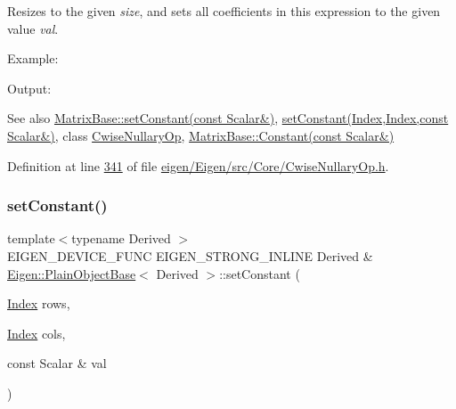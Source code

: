 Resizes to the given {\itshape size}, and sets all coefficients in this expression to the given value {\itshape val}.

Example\+: 
\begin{DoxyCodeInclude}
\end{DoxyCodeInclude}
 Output\+: 
\begin{DoxyVerbInclude}
\end{DoxyVerbInclude}


\begin{DoxySeeAlso}{See also}
\hyperlink{group___core___module_a19b2bc788277e9ab3f967a8857e290ae}{Matrix\+Base\+::set\+Constant(const Scalar\&)}, \hyperlink{class_eigen_1_1_plain_object_base_a56d1fe5d2156174f88341e563bb3c5a9}{set\+Constant(\+Index,\+Index,const Scalar\&)}, class \hyperlink{group___core___module_class_eigen_1_1_cwise_nullary_op}{Cwise\+Nullary\+Op}, \hyperlink{group___core___module_a9053c1a2e9993febe50113b05aac0f20}{Matrix\+Base\+::\+Constant(const Scalar\&)} 
\end{DoxySeeAlso}


Definition at line \hyperlink{eigen_2_eigen_2src_2_core_2_cwise_nullary_op_8h_source_l00341}{341} of file \hyperlink{eigen_2_eigen_2src_2_core_2_cwise_nullary_op_8h_source}{eigen/\+Eigen/src/\+Core/\+Cwise\+Nullary\+Op.\+h}.

\mbox{\label{class_eigen_1_1_plain_object_base_a56d1fe5d2156174f88341e563bb3c5a9}} 
\subsubsection{\texorpdfstring{set\+Constant()}{setConstant()}\hspace{0.1cm}{\footnotesize\ttfamily [2/2]}}
{\footnotesize\ttfamily template$<$typename Derived $>$ \\
E\+I\+G\+E\+N\+\_\+\+D\+E\+V\+I\+C\+E\+\_\+\+F\+U\+NC E\+I\+G\+E\+N\+\_\+\+S\+T\+R\+O\+N\+G\+\_\+\+I\+N\+L\+I\+NE Derived \& \hyperlink{class_eigen_1_1_plain_object_base}{Eigen\+::\+Plain\+Object\+Base}$<$ Derived $>$\+::set\+Constant (\begin{DoxyParamCaption}\item[{\hyperlink{namespace_eigen_a62e77e0933482dafde8fe197d9a2cfde}{Index}}]{rows,  }\item[{\hyperlink{namespace_eigen_a62e77e0933482dafde8fe197d9a2cfde}{Index}}]{cols,  }\item[{const Scalar \&}]{val }\end{DoxyParamCaption})}

